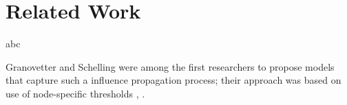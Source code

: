 
\section{Related Work}\label{sec:related-work}
abc

\cite{backstrom2011supervised}

\cite{elo1986rating}

\cite{kwak2010twitter}

\cite{welch2011topical}

\cite{wu2011says}

\cite{yang2011like}


Granovetter and Schelling were among the first researchers to propose models that capture such a influence propagation process; their approach was based on use of node-specific thresholds \cite{snowball1}, \cite{snowball2}. 